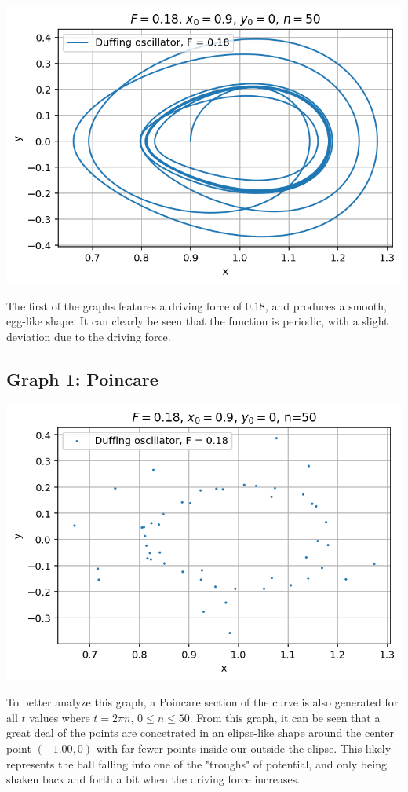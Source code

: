 \documentclass[aps,pra,notitlepage,amsmath,amssymb,letterpaper,12pt]{revtex4-1}
\begin{document}
\includegraphics{graph1.png}

The first of the graphs features a driving force of $0.18$, and produces a smooth, egg-like shape.  It can clearly be seen that the function is periodic, with a slight deviation due to the driving force.

\subsection{Graph 1: Poincare}

\includegraphics{poincare1.png}

To better analyze this graph, a Poincare section of the curve is also generated for all $t$ values where $t = 2\pi n \text{, } 0 \leq n \leq 50$. From this graph, it can be seen that a great deal of the points are concetrated in an elipse-like shape around the center point $(-1.00, 0)$ with far fewer points inside our outside the elipse.  This likely represents the ball falling into one of the "troughs" of potential, and only being shaken back and forth a bit when the driving force increases.
\end{document}
